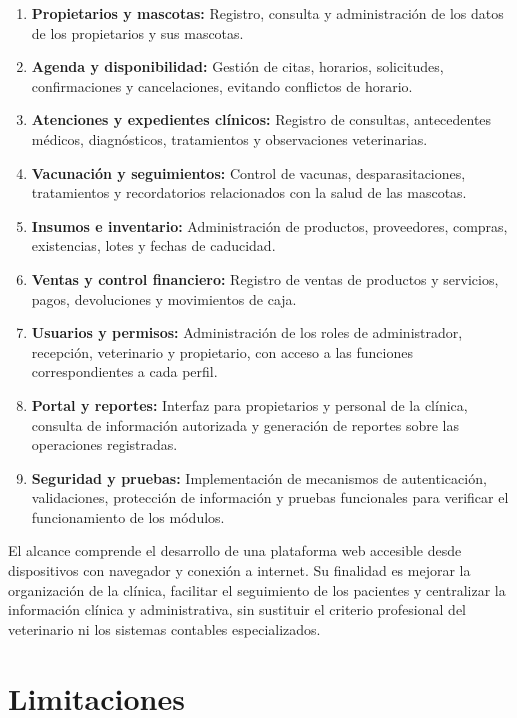 \begin{enumerate}
    \item \textbf{Propietarios y mascotas:} Registro, consulta y administración de los datos de los propietarios y sus mascotas.
    \item \textbf{Agenda y disponibilidad:} Gestión de citas, horarios, solicitudes, confirmaciones y cancelaciones, evitando conflictos de horario.
    \item \textbf{Atenciones y expedientes clínicos:} Registro de consultas, antecedentes médicos, diagnósticos, tratamientos y observaciones veterinarias.
    \item \textbf{Vacunación y seguimientos:} Control de vacunas, desparasitaciones, tratamientos y recordatorios relacionados con la salud de las mascotas.
    \item \textbf{Insumos e inventario:} Administración de productos, proveedores, compras, existencias, lotes y fechas de caducidad.
    \item \textbf{Ventas y control financiero:} Registro de ventas de productos y servicios, pagos, devoluciones y movimientos de caja.
    \item \textbf{Usuarios y permisos:} Administración de los roles de administrador, recepción, veterinario y propietario, con acceso a las funciones correspondientes a cada perfil.
    \item \textbf{Portal y reportes:} Interfaz para propietarios y personal de la clínica, consulta de información autorizada y generación de reportes sobre las operaciones registradas.
    \item \textbf{Seguridad y pruebas:} Implementación de mecanismos de autenticación, validaciones, protección de información y pruebas funcionales para verificar el funcionamiento de los módulos.
\end{enumerate}

El alcance comprende el desarrollo de una plataforma web accesible desde dispositivos con navegador y conexión a internet. Su finalidad es mejorar la organización de la clínica, facilitar el seguimiento de los pacientes y centralizar la información clínica y administrativa, sin sustituir el criterio profesional del veterinario ni los sistemas contables especializados.

\section{Limitaciones}

